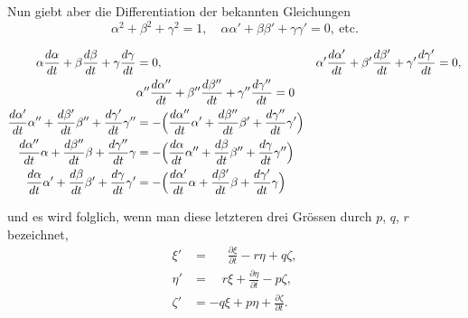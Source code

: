 \documentclass[12pt,a4paper]{book}
\theoremstyle{definition}
\theoremstyle{remark}
\begin{document}
Nun giebt aber die Differentiation der bekannten Gleichungen
\[
\alpha^2 + \beta^2 + \gamma^2 = 1,\quad \alpha\alpha' + \beta\beta' + \gamma\gamma' = 0,\ \text{etc.}
\]

\newpage

\begin{align*}
\alpha\frac{d\alpha}{dt} + \beta\frac{d\beta}{dt} + \gamma\frac{d\gamma}{dt} &= 0, &
\alpha'\frac{d\alpha'}{dt} + \beta'\frac{d\beta'}{dt} + \gamma'\frac{d\gamma'}{dt} &= 0,\\
&\alpha''\frac{d\alpha''}{dt} + \beta''\frac{d\beta''}{dt} + \gamma''\frac{d\gamma''}{dt} = 0 &\\
\frac{d\alpha'}{dt}\alpha'' + \frac{d\beta'}{dt}\beta'' + \frac{d\gamma'}{dt}\gamma'' &= -\Bigl(\frac{d\alpha''}{dt}\alpha' + \frac{d\beta''}{dt}\beta' + \frac{d\gamma''}{dt}\gamma'\Bigr) &\\
\frac{d\alpha''}{dt}\alpha + \frac{d\beta''}{dt}\beta + \frac{d\gamma''}{dt}\gamma &= -\Bigl(\frac{d\alpha}{dt}\alpha'' + \frac{d\beta}{dt}\beta'' + \frac{d\gamma}{dt}\gamma''\Bigr) &\\
\frac{d\alpha}{dt}\alpha' + \frac{d\beta}{dt}\beta' + \frac{d\gamma}{dt}\gamma' &= -\Bigl(\frac{d\alpha'}{dt}\alpha + \frac{d\beta'}{dt}\beta + \frac{d\gamma'}{dt}\gamma\Bigr) &
\end{align*}

\begin{equation}
\tag{3}
\end{equation}
und es wird folglich, wenn man diese letzteren drei Grössen durch $p$, $q$, $r$ bezeichnet,
\begin{equation}
\tag{4}
\begin{aligned}
\xi' &= \quad\ \ \frac{\partial \xi}{\partial t} - r\eta + q\zeta,\\
\eta' &= \quad r\xi + \frac{\partial \eta}{\partial t} - p\zeta,\\
\zeta' &= -q\xi + p\eta + \frac{\partial \zeta}{\partial t}.
\end{aligned}
\end{equation}
\end{document}

